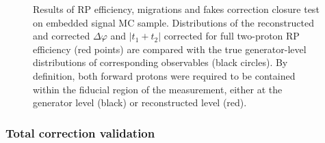 \begin{figure}[h]
{\begin{subfigure}[b]{\linewidth}
  \end{subfigure}
}%
\caption[Results of RP efficiency, migrations and fakes correction closure test on embedded signal MC sample.]{Results of RP efficiency,  migrations and fakes correction closure test on embedded signal MC sample. Distributions of the reconstructed and corrected $\Delta\varphi$ and $|t_{1}+t_{2}|$ corrected for full two-proton RP efficiency (red points) are compared with the true generator-level distributions of corresponding observables (black circles). By definition, both forward protons were required to be contained within the fiducial region of the measurement, either at the generator level (black) or reconstructed level (red).}\label{fig:closureTestTpcTofSingleTrk}%
\end{figure}




\subsubsection{Total correction validation}\label{subsec:closureTestFull} 

